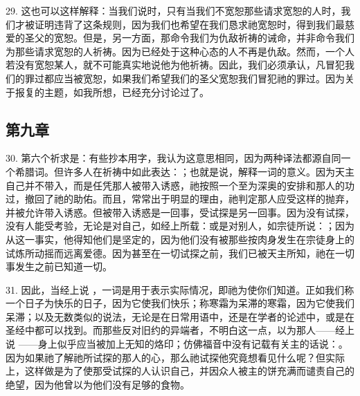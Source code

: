 29. 这也可以这样解释：当我们说时，只有当我们不宽恕那些请求宽恕的人时，我们才被证明违背了这条规则，因为我们也希望在我们恳求祂宽恕时，得到我们最慈爱的圣父的宽恕。但是，另一方面，那命令我们为仇敌祈祷的诫命，并非命令我们为那些请求宽恕的人祈祷。因为已经处于这种心态的人不再是仇敌。然而，一个人若没有宽恕某人，就不可能真实地说他为他祈祷。因此，我们必须承认，凡冒犯我们的罪过都应当被宽恕，如果我们希望我们的圣父宽恕我们冒犯祂的罪过。因为关于报复的主题，如我所想，已经充分讨论过了。\par


\subsection{第九章}

30. 第六个祈求是：有些抄本用字，我认为这意思相同，因为两种译法都源自同一个希腊词。但许多人在祈祷中如此表达：；也就是说，解释一词的意义。因为天主自己并不带入，而是任凭那人被带入诱惑，祂按照一个至为深奥的安排和那人的功过，撤回了祂的助佑。而且，常常出于明显的理由，祂判定那人应受这样的抛弃，并被允许带入诱惑。但被带入诱惑是一回事，受试探是另一回事。因为没有试探，没有人能受考验，无论是对自己，如经上所载：或是对别人，如宗徒所说：；因为从这一事实，他得知他们是坚定的，因为他们没有被那些按肉身发生在宗徒身上的试炼所动摇而远离爱德。因为甚至在一切试探之前，我们已被天主所知，祂在一切事发生之前已知道一切。\par

31. 因此，当经上说 ，一词是用于表示实际情况，即祂为使你们知道。正如我们称一个日子为快乐的日子，因为它使我们快乐；称寒霜为呆滞的寒霜，因为它使我们呆滞；以及无数类似的说法，无论是在日常用语中，还是在学者的论述中，或是在圣经中都可以找到。而那些反对旧约的异端者，不明白这一点，以为那人——经上说 ——身上似乎应当被加上无知的烙印；仿佛福音中没有记载有关主的话说：。因为如果祂了解祂所试探的那人的心，那么祂试探他究竟想看见什么呢？但实际上，这样做是为了使那受试探的人认识自己，并因众人被主的饼充满而谴责自己的绝望，因为他曾以为他们没有足够的食物。\par

